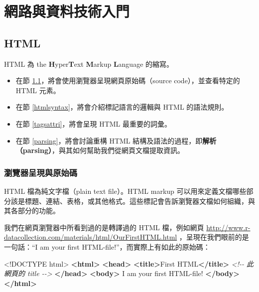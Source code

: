 \documentclass[
]{book}
\newenvironment{Shaded}{\begin{snugshade}}{\end{snugshade}}
\newcommand{\CommentTok}[1]{\textcolor[rgb]{0.56,0.35,0.01}{\textit{#1}}}
\newcommand{\DataTypeTok}[1]{\textcolor[rgb]{0.13,0.29,0.53}{#1}}
\newcommand{\KeywordTok}[1]{\textcolor[rgb]{0.13,0.29,0.53}{\textbf{#1}}}
\newcommand{\NormalTok}[1]{#1}
\theoremstyle{definition}
\theoremstyle{remark}
\begin{document}
\hypertarget{part-ux7db2ux8defux8207ux8cc7ux6599ux6280ux8853ux5165ux9580}{%
\part{網路與資料技術入門}\label{part-ux7db2ux8defux8207ux8cc7ux6599ux6280ux8853ux5165ux9580}}

\hypertarget{html}{%
\chapter{HTML}\label{html}}

HTML 為 the \textbf{H}yper\textbf{T}ext \textbf{M}arkup \textbf{L}anguage 的縮寫。

\begin{itemize}
\item
  在節 \ref{sourcecode}，將會使用瀏覽器呈現網頁原始碼（source code），並查看特定的 HTML 元素。
\item
  在節 \ref{htmlsyntax}，將會介紹標記語言的邏輯與 HTML 的語法規則。
\item
  在節 \ref{tagsattri}，將會呈現 HTML 最重要的詞彙。
\item
  在節 \ref{parsing}，將會討論重構 HTML 結構及語法的過程，即\textbf{解析（parsing）}，與其如何幫助我們從網頁文檔提取資訊。
\end{itemize}

\hypertarget{sourcecode}{%
\section{瀏覽器呈現與原始碼}\label{sourcecode}}

HTML 檔為純文字檔（plain text file）。HTML markup 可以用來定義文檔哪些部分該是標題、連結、表格，或其他格式。這些標記會告訴瀏覽器文檔如何組織，與其各部分的功能。

我們在網頁瀏覽器中所看到過的是轉譯過的 HTML 檔，例如網頁 \url{http://www.r-datacollection.com/materials/html/OurFirstHTML.html} ，呈現在我們眼前的是一句話：``I am your first HTML-file!''，而實際上有如此的原始碼：

\begin{Shaded}
\begin{Highlighting}[]
\DataTypeTok{\textless{}!DOCTYPE }\NormalTok{html}\DataTypeTok{\textgreater{}}
 \KeywordTok{\textless{}html\textgreater{}}
   \KeywordTok{\textless{}head\textgreater{}}
     \KeywordTok{\textless{}title\textgreater{}}\NormalTok{First HTML}\KeywordTok{\textless{}/title\textgreater{}}  \CommentTok{\textless{}!{-}{-} 此網頁的 title {-}{-}\textgreater{}}  
   \KeywordTok{\textless{}/head\textgreater{}}
   \KeywordTok{\textless{}body\textgreater{}}
\NormalTok{     I am your first HTML{-}file!}
   \KeywordTok{\textless{}/body\textgreater{}}
 \KeywordTok{\textless{}/html\textgreater{}}
\end{Highlighting}
\end{Shaded}
\end{document}
